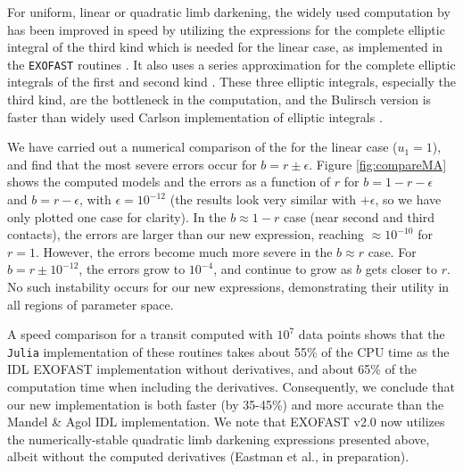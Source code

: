 \documentclass[modern]{aastex61}
\begin{document}
For uniform, linear or quadratic limb darkening, the widely used computation
by \citet{MandelAgol2002} has been improved in speed by utilizing the
\citet{Bulirsch1965a,Bulirsch1965b} expressions for the complete elliptic
integral of the third kind which is needed for the linear case, as implemented
in the \texttt{EXOFAST} routines \citep{Eastman2013}.  It also uses a series
approximation for the complete elliptic integrals of the first and second
kind \citep{Hastings1955}. These three elliptic integrals, especially the third
kind, are the bottleneck in the computation, and the Bulirsch version is faster
than widely used Carlson implementation of elliptic integrals \citep{Carlson1979}.

We have carried out a numerical comparison of the \citet{MandelAgol2002}
for the linear case ($u_1=1$), and find that the most severe errors
occur for $b = r \pm \epsilon$.  Figure \ref{fig:compareMA} shows
the computed models and the errors as a function of $r$ for $b=1-r-\epsilon$
and $b=r-\epsilon$, with $\epsilon = 10^{-12}$ (the results look very
similar with $+\epsilon$, so we have only plotted one case for clarity).
In the $b\approx 1-r$ case (near second and third contacts), the errors
are larger than our new expression, reaching $\approx 10^{-10}$ for
$r = 1$.  However, the errors become much more severe in the $b \approx r$
case.  For $b=r \pm 10^{-12}$, the errors grow to $10^{-4}$, and continue
to grow as $b$ gets closer to $r$.  No such instability occurs for
our new expressions, demonstrating their utility in all regions of
parameter space.

A speed comparison for a transit computed with $10^7$ data points shows that
the \texttt{Julia} implementation of these routines takes about 55\% of the CPU
time as the IDL EXOFAST implementation without derivatives, and about 65\%
of the computation time when including the derivatives.  Consequently, we
conclude that our new implementation is both faster (by 35-45\%) and more
accurate than the Mandel \& Agol IDL implementation.  We note that EXOFAST
v2.0 now utilizes the numerically-stable quadratic limb darkening expressions
presented above, albeit without the computed derivatives (Eastman et al.,
in preparation).
\end{document}
